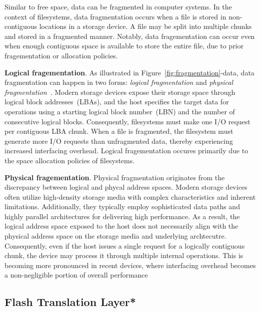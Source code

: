 Similar to free space, data can be fragmented in computer systems.
In the context of filesystems, data fragmentation occurs when a file is stored in non-contiguous locations in a storage device.
A file may be split into multiple chunks and stored in a fragmented manner.
Notably, data fragementation can occur even when enough contiguous space is available to store the entire file, due to prior fragementation or allocation policies.

\textbf{Logical fragementation}.
As illustrated in Figure~\ref{fig:fragmentation}-data, data fragmentation can happen in two forms: \emph{logical fragmentation} and \emph{physical fragmentation}~\cite{janusd:atc17}.
Modern storage devices expose their storage space through logical block addresses~(LBAs), and the host specifies the target data for operations using a starting logical block number~(LBN) and the number of consecutive logical blocks.
Consequently, filesystems must make one I/O request per contiguous LBA chunk.
When a file is fragmented, the filesystem must generate more I/O requests than unfragmented data, thereby experiencing increased interfacing overhead.
Logical fragementation occures primarily due to the space allocation policies of filesystems.

\textbf{Physical fragementation}.
Physical fragmentation originates from the discrepancy between logical and phycal address spaces.
Modern storage devices often utilize high-density storage media with complex characteristics and inherent limitations.
Additionally, they typically employ sophisticated data paths and highly parallel architectures for delivering high performance.
As a result, the logical address space exposed to the host does not necessarily align with the physical address space on the storage media and underlying archtecutre.
Consequently, even if the host issues a single request for a logically contiguous chunk, the device may process it through multiple internal operations.
This is becoming more pronounced in recent devices, where interfacing overhead becomes a non-negligible portion of overall performance~\cite{Problem_in_SSD_Empirical,senescence:fast17,Problem_in_SSD_Mobile_Devices,survey:ictc23,no-afraid:fast24,defrag-mobile:atc17,fragpicker:sosp21}

\subsection{Flash Translation Layer*}\label{ss:ftl}

